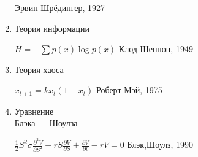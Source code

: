 \documentclass[12pt]{article}
\begin{document}
\begin{enumerate}
\begin{minipage}[t]{100mm}
    \hfill Эрвин Шрёдингер, 1927 \end{minipage}
 \item Теория информации \hfill
  \begin{minipage}[t]{100mm} $H = - \sum p(x)\log p(x)$ \hfill Клод Шеннон, 1949
   \end{minipage}
 \item Теория хаоса  \hfill \begin{minipage}[t]{100mm} $x_{t+1} = kx_{t}(1-x_{t})$  \hfill Роберт Мэй, 1975 \end{minipage}
   \item \begin{minipage}[t]{45mm} Уравнение \\Блэка — Шоулза\\ \end{minipage}
  \hfill 
 \begin{minipage}[t]{110mm}  $\frac{1}{2} S^{2}\sigma \frac{\partial^{2} V}{\partial S^{2}} +rS\frac{\partial V}{\partial S} +\frac{\partial V}{\partial t} -rV=0 $ \hfill Блэк,Шоулз, 1990 \end{minipage}
\end{enumerate}
\end{document}
